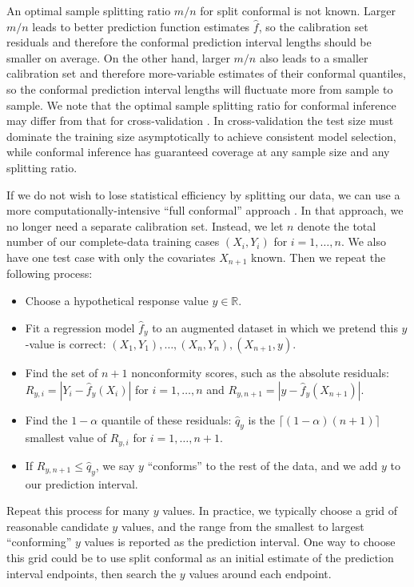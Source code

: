 \documentclass[10.5pt, letterpaper]{article}
\numberwithin{table}{section}
\numberwithin{figure}{section}
\numberwithin{equation}{section}
\begin{document}
An optimal sample splitting ratio $m/n$ for split conformal is not known. Larger $m/n$ leads to better prediction function estimates $\hat f$, so the calibration set residuals and therefore the conformal prediction interval lengths should be smaller on average. On the other hand, larger $m/n$ also leads to a smaller calibration set and therefore more-variable estimates of their conformal quantiles, so the conformal prediction interval lengths will fluctuate more from sample to sample. We note that the optimal sample splitting ratio for conformal inference may differ from that for cross-validation \citep{shao1993linear, wieczorek2022model}. In cross-validation the test size must dominate the training size asymptotically to achieve consistent model selection, while conformal inference has guaranteed coverage at any sample size and any splitting ratio.

If we do not wish to lose statistical efficiency by splitting our data, we can use a more computationally-intensive ``full conformal'' approach \citep{vovk2005algorithmic}. In that approach, we no longer need a separate calibration set. Instead, we let $n$ denote the total number of our complete-data training cases $(X_i,Y_i)$ for $i=1,\ldots,n$. We also have one test case with only the covariates $X_{n+1}$ known. Then we repeat the following process:

\begin{itemize}
  \item Choose a hypothetical response value $y \in \mathbb{R}$.
  \item Fit a regression model $\hat f_y$ to an augmented dataset in which we pretend this $y$-value is correct: $(X_1,Y_1),\ldots,(X_n,Y_n),(X_{n+1},y)$.
  \item Find the set of $n+1$ nonconformity scores, such as the absolute residuals: $R_{y,i} = |Y_i-\hat f_y(X_i)|$ for $i=1,\ldots,n$ and  $R_{y,n+1}=|y-\hat f_y(X_{n+1})|$.
  \item Find the $1-\alpha$ quantile of these residuals: $\hat q_y$ is the $\lceil (1-\alpha)(n+1) \rceil$ smallest value of $R_{y,i}$ for $i=1,\ldots,n+1$.
  \item If $R_{y,n+1} \leq \hat q_y$, we say $y$ ``conforms'' to the rest of the data, and we add $y$ to our prediction interval.
\end{itemize}
Repeat this process for many $y$ values. In practice, we typically choose a grid of reasonable candidate $y$ values, and the range from the smallest to largest ``conforming'' $y$ values is reported as the prediction interval. One way to choose this grid could be to use split conformal as an initial estimate of the prediction interval endpoints, then search the $y$ values around each endpoint.
\end{document}
